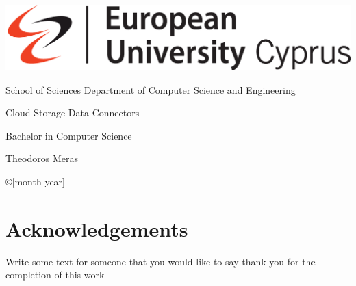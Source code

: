 \documentclass[12pt,a4paper]{report}
\begin{document}
    \thispagestyle{empty}
    {

    \noindent\includegraphics[scale=0.32]{images/euc}


        \begin{center}
            School of Sciences \textbar \; Department of Computer Science and Engineering
        \end{center}

        \vspace{1.5cm}
        \begin{center}
            \Huge  Cloud Storage Data Connectors
        \end{center}


        \vspace{0.2cm}

        \vspace{1.5cm}
        \begin{center}
            \LARGE Bachelor in Computer Science
        \end{center}


        \vspace{1.5cm}
        \begin{center}
            \Large Theodoros Meras
        \end{center}
        \vspace{1.5cm}

        \noindent
        \begin{center}
            \copyright  [month year]
        \end{center}
        \newpage
        \thispagestyle{empty}

    }%

    \section*{Acknowledgements}
    Write some text for someone that you would like to say thank you for the completion of this work

    \newpage
    

    \newpage
    
    
    
    
    
    
    


    
    
\end{document}

